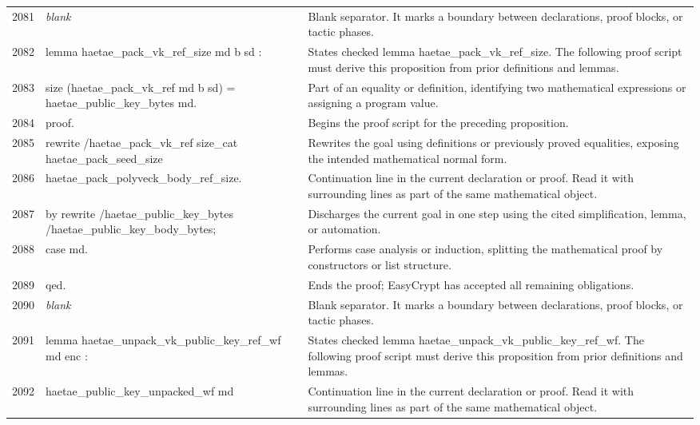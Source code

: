 \documentclass[10pt]{article}
\begin{document}
\begin{longtable}{r L{0.53\textwidth} L{0.37\textwidth}}
2081 & {\ttfamily\scriptsize \emph{blank}} & Blank separator.  It marks a boundary between declarations, proof blocks, or tactic phases. \\
2082 & {\ttfamily\scriptsize lemma haetae\_pack\_vk\_ref\_size md b sd :} & States checked lemma haetae\_pack\_vk\_ref\_size.  The following proof script must derive this proposition from prior definitions and lemmas. \\
2083 & {\ttfamily\scriptsize   size (haetae\_pack\_vk\_ref md b sd) = haetae\_public\_key\_bytes md.} & Part of an equality or definition, identifying two mathematical expressions or assigning a program value. \\
2084 & {\ttfamily\scriptsize proof.} & Begins the proof script for the preceding proposition. \\
2085 & {\ttfamily\scriptsize rewrite /haetae\_pack\_vk\_ref size\_cat haetae\_pack\_seed\_size} & Rewrites the goal using definitions or previously proved equalities, exposing the intended mathematical normal form. \\
2086 & {\ttfamily\scriptsize         haetae\_pack\_polyveck\_body\_ref\_size.} & Continuation line in the current declaration or proof.  Read it with surrounding lines as part of the same mathematical object. \\
2087 & {\ttfamily\scriptsize by rewrite /haetae\_public\_key\_bytes /haetae\_public\_key\_body\_bytes;} & Discharges the current goal in one step using the cited simplification, lemma, or automation. \\
2088 & {\ttfamily\scriptsize    case md.} & Performs case analysis or induction, splitting the mathematical proof by constructors or list structure. \\
2089 & {\ttfamily\scriptsize qed.} & Ends the proof; EasyCrypt has accepted all remaining obligations. \\
2090 & {\ttfamily\scriptsize \emph{blank}} & Blank separator.  It marks a boundary between declarations, proof blocks, or tactic phases. \\
2091 & {\ttfamily\scriptsize lemma haetae\_unpack\_vk\_public\_key\_ref\_wf md enc :} & States checked lemma haetae\_unpack\_vk\_public\_key\_ref\_wf.  The following proof script must derive this proposition from prior definitions and lemmas. \\
2092 & {\ttfamily\scriptsize   haetae\_public\_key\_unpacked\_wf md} & Continuation line in the current declaration or proof.  Read it with surrounding lines as part of the same mathematical object. \\

\end{longtable}
\end{document}
